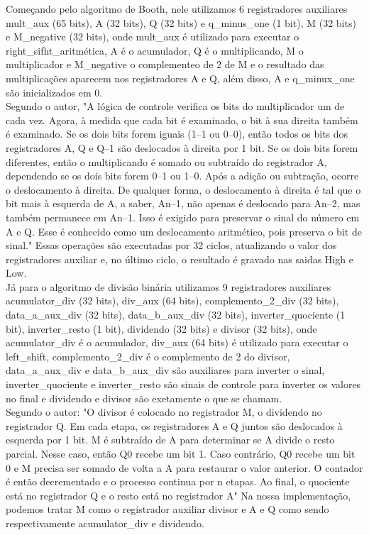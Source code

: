 Começando pelo algoritmo de Booth, nele utilizamos 6 registradores auxiliares mult\_aux (65 bits), A (32 bits), Q (32 bits) e q\_minus\_one (1 bit), M (32 bits) e M\_negative (32 bits), onde mult\_aux é utilizado para executar o right\_sifht\_aritmética, A é o acumulador, Q é o multiplicando, M o multiplicador e M\_negative o complementeo de 2 de M e o resultado das multiplicações aparecem nos registradores A e Q, além disso, A e q\_minux\_one são inicializados em 0. \\

Segundo o autor, "A lógica de controle verifica os bits do multiplicador um de cada vez. Agora, à medida que cada bit é examinado, o bit à sua direita também é examinado. Se os dois bits forem iguais (1–1 ou 0–0), então todos os bits dos registradores A, Q e Q–1 são deslocados à direita por 1 bit. Se os dois bits forem diferentes, então o multiplicando é somado ou subtraído do registrador A, dependendo se os dois bits forem 0–1 ou 1–0. Após a adição ou subtração, ocorre o deslocamento à direita. De qualquer forma, o deslocamento à direita é tal que o bit mais à esquerda de A, a saber, An–1, não apenas é deslocado para An–2, mas também permanece em An–1. Isso é exigido para preservar o sinal do número em A e Q. Esse é conhecido como um deslocamento aritmético, pois preserva o bit de sinal." Essas operações são executadas por 32 ciclos, atualizando o valor dos registradores auxiliar e, no último ciclo, o resultado é gravado nas saidas High e Low. \\

Já para o algoritmo de divisão binária utilizamos 9 registradores auxiliares acumulator\_div (32 bits), div\_aux (64 bits), complemento\_2\_div (32 bits), data\_a\_aux\_div (32 bits), data\_b\_aux\_div (32 bits), inverter\_quociente (1 bit), inverter\_resto (1 bit), dividendo (32 bits) e divisor (32 bits), onde acumulator\_div é o acumulador, div\_aux (64 bits) é utilizado para executar o left\_shift, complemento\_2\_div é o complemento de 2 do divisor, data\_a\_aux\_div e data\_b\_aux\_div são auxiliares para inverter o sinal, inverter\_quociente e inverter\_resto são sinais de controle para inverter os valores no final e dividendo e divisor são exetamente o que se chamam. \\

Segundo o autor: "O divisor é colocado no registrador M, o dividendo no registrador Q. Em cada etapa, os registradores A e Q juntos são deslocados à esquerda por 1 bit. M é subtraído de A para determinar se A divide o resto parcial. Nesse caso, então Q0  recebe um bit 1. Caso contrário, Q0 recebe um bit 0 e M precisa ser somado de volta a A para restaurar o valor anterior. O contador é então decrementado e o processo continua por n etapas. Ao final, o quociente está no registrador Q e o resto está no registrador A" Na nossa implementação, podemos tratar M como o registrador auxiliar divisor e A e Q como sendo respectivamente acumulator\_div e dividendo. \\

